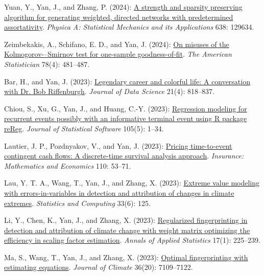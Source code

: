 \begin{RefereedJournalArticles}
\item *Yuan, Y., Yan, J., and Zhang, P. (2024):
\href{https://doi.org/10.1016/j.physa.2024.129634}{A strength and
sparsity preserving algorithm for generating weighted, directed networks
with predetermined assortativity}. \emph{Physica A: Statistical
Mechanics and its Applications} 638: 129634.

\item *Zeimbekakis, A., Schifano, E. D., and Yan, J. (2024):
\href{https://doi.org/10.1080/00031305.2024.2356095}{On misuses of the
Kolmogorov-\/--Smirnov test for one-sample goodness-of-fit}. \emph{The
American Statistician} 78(4): 481--487.

\item Bar, H., and Yan, J. (2023):
\href{https://doi.org/10.6339/23-JDS1115}{Legendary career and colorful
life: A conversation with Dr. Bob Riffenburgh}. \emph{Journal of Data
Science} 21(4): 818--837.

\item *Chiou, S., Xu, G., Yan, J., and Huang, C.-Y. (2023):
\href{https://doi.org/10.18637/jss.v105.i05}{Regression modeling for
recurrent events possibly with an informative terminal event using R
package reReg}. \emph{Journal of Statistical Software} 105(5): 1--34.

\item *Lautier, J. P., Pozdnyakov, V., and Yan, J. (2023):
\href{https://doi.org/10.1016/j.insmatheco.2023.02.003}{Pricing
time-to-event contingent cash flows: A discrete-time survival analysis
approach}. \emph{Insurance: Mathematics and Economics} 110: 53--71.

\item *Lau, Y. T. A., Wang, T., Yan, J., and Zhang, X. (2023):
\href{https://doi.org/10.1007/s11222-023-10290-8}{Extreme value modeling
with errors-in-variables in detection and attribution of changes in
climate extremes}. \emph{Statistics and Computing} 33(6): 125.

\item *Li, Y., Chen, K., Yan, J., and Zhang, X. (2023):
\href{https://doi.org/10.1214/22-AOAS1624}{Regularized fingerprinting in
detection and attribution of climate change with weight matrix
optimizing the efficiency in scaling factor estimation}. \emph{Annals of
Applied Statistics} 17(1): 225--239.

\item *Ma, S., Wang, T., Yan, J., and Zhang, X. (2023):
\href{https://doi.org/10.1175/JCLI-D-22-0681.1}{Optimal fingerprinting
with estimating equations}. \emph{Journal of Climate} 36(20):
7109--7122.


\end{RefereedJournalArticles}
